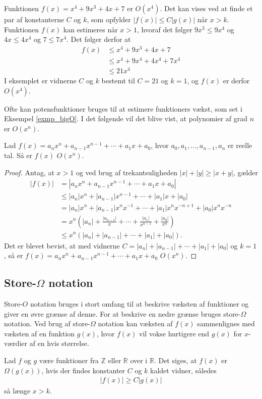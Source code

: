 \begin{exmp}\label{exmp_bigO}
Funktionen $f(x)=x^4+9x^3+4x+7$ er $O(x^4)$. Det kan vises ved at finde et par af konstanterne $C$ og $k$, som opfylder $|f(x)| \leq C |g(x)|$ når $x>k$. Funktionen $f(x)$ kan estimeres når $x>1$, hvoraf det følger $9x^3\leq 9x^4$ og $4x\leq 4x^4$ og $7\leq 7x^4$. Det følger derfor at 
\begin{align*}
f(x) &\leq x^4+9x^3+4x+7 \\
&\leq x^4+9x^4+4x^4+7x^4 \\
&\leq 21x^4
\end{align*}
I eksemplet er vidnerne $C$ og $k$ bestemt til $C=21$ og $k=1$, og $f(x)$ er derfor $O(x^4)$. 
\end{exmp} 
\noindent Ofte kan potensfunktioner bruges til at estimere funktioners vækst, som set i Eksempel \ref{exmp_bigO}. 
I det følgende vil det blive vist, at polynomier af grad $n$ er $O(x^n)$. \\
\begin{thm}
Lad $f(x)=a_nx^n+a_{n-1}x^{n-1}+\cdots +a_1x+a_0$, hvor $a_0, a_1, \dotsc, a_{n-1}, a_n$ er reelle tal. 
Så er $f(x)$ $O(x^n)$.
\label{thm_poly}
\end{thm}

\begin{proof}
Antag, at $x>1$ og ved brug af trekantsuligheden $|x| + |y| \geq |x + y|$, gælder
	\begin{align*}
		|f(x)| &= |a_nx^n+a_{n-1}x^{n-1}+ \cdots +a_1x+a_0| \\
		&\leq |a_n|x^n + |a_{n-1}| x^{n-1}+ \cdots + |a_1| x +|a_0| \\
		&= |a_n| x^n + |a_{n-1}| x^nx^{-1}+ \cdots + |a_1| x^n x^{-n+1}+|a_0| x^nx^{-n} \\
		&= x^n \left(|a_n| + \frac{|a_{n-1}|}{x}+ \cdots +\frac{|a_1|}{x^{n-1}}+\frac{|a_0|}{x^n} \right) \\
		&\leq x^n(|a_n| + |a_{n-1}| + \cdots + |a_1| + |a_0| ).
	\end{align*}
Det er blevet bevist, at med vidnerne $C= |a_n| + |a_{n-1}| + \cdots + |a_1| + |a_0|$ og $k=1$, så er $f(x)=a_nx^n+a_{n-1}x^{n-1}+\cdots +a_1x+a_0$ $O(x^n)$.
\end{proof}

\subsection{Store-$\Omega$ notation}
Store-$O$ notation bruges i stort omfang til at beskrive væksten af funktioner og giver en øvre grænse af denne. 
For at beskrive en nedre grænse bruges store-$\Omega$ notation. Ved brug af store-$\Omega$ notation kan væksten af $f(x)$ sammenlignes med væksten af en funktion $g(x)$, hvor $f(x)$ vil vokse hurtigere end $g(x)$ for $x$-værdier af en hvis størrelse. \\
\begin{defn}
	Lad $f$ og $g$ være funktioner fra $\mathbb{Z}$ eller $\mathbb{R}$ over i $\mathbb{R}$. 
	Det siges, at $f(x)$ er $\Omega(g(x))$, hvis der findes konstanter $C$ og $k$ kaldet vidner, således 
	\begin{align}
		|f(x)| \geq C |g(x)|
	\end{align}
så længe $x>k$.
\end{defn}

